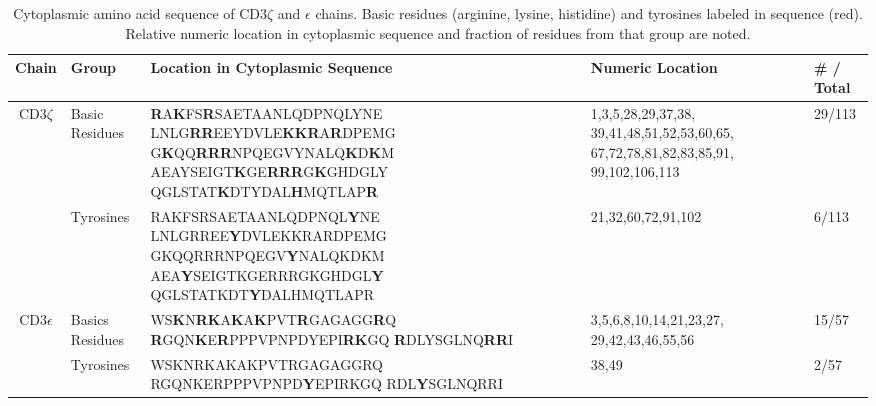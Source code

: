 \documentclass[../../AdvancementSummary.tex]{subfiles}
\begin{document}
\begin{table}[H]
    \caption{Cytoplasmic amino acid sequence of CD3$\zeta$ and $\epsilon$ chains. Basic residues (arginine, lysine, histidine) and tyrosines labeled in sequence (red). Relative numeric location in cytoplasmic sequence and fraction of residues from that group are noted. \label{table: BasicsYLocation}}
    \begin{center}
    \begin{tabular}{|c|p{2cm}|p{6cm}|p{3.5cm}|p{1.6cm}|}
    	\hline
	Chain 		& 		Group			&		Location in Cytoplasmic Sequence	&	Numeric Location		&		\# / Total	\\
	\hline
	
	
    	\multicolumn{1}{|c|}{\multirow{2}[0]{*}{CD3$\zeta$}} 	&  	Basic Residues				& 	
	
	\textbf{\color{red}R}A\textbf{\color{red}K}FS\textbf{\color{red}R}SAETAANLQDPNQLYNE
	LNLG\textbf{\color{red}RR}EEYDVLE\textbf{\color{red}KKR}A\textbf{\color{red}R}DPEMG
	G\textbf{\color{red}K}QQ\textbf{\color{red}RRR}NPQEGVYNALQ\textbf{\color{red}K}D\textbf{\color{red}K}M
	AEAYSEIGT\textbf{\color{red}K}GE\textbf{\color{red}RRR}G\textbf{\color{red}K}GHDGLY
	QGLSTAT\textbf{\color{red}K}DTYDAL\textbf{\color{red}H}MQTLAP\textbf{\color{red}R}		& 	
	
	1,3,5,28,29,37,38,
	39,41,48,51,52,53,60,65,
	67,72,78,81,82,83,85,91,
	99,102,106,113 		& 	
	
	29/113	\\
	\cline{2-5}
	
	
	
		&	 Tyrosines									&	
	
	RAKFSRSAETAANLQDPNQL\textbf{\color{red}Y}NE
	LNLGRREE\textbf{\color{red}Y}DVLEKKRARDPEMG
	GKQQRRRNPQEGV\textbf{\color{red}Y}NALQKDKM
	AEA\textbf{\color{red}Y}SEIGTKGERRRGKGHDGL\textbf{\color{red}Y}
	QGLSTATKDT\textbf{\color{red}Y}DALHMQTLAPR 				& 	
	
	21,32,60,72,91,102											&	
	
	6/113			\\
	\hline
	
	
	\multicolumn{1}{|c|}{\multirow{2}{*}{CD3$\epsilon$}}	&	 Basics Residues		&
	
	WS\textbf{\color{red}K}N\textbf{\color{red}RK}A\textbf{\color{red}K}A\textbf{\color{red}K}PVT\textbf{\color{red}R}GAGAGG\textbf{\color{red}R}Q
	\textbf{\color{red}R}GQN\textbf{\color{red}K}E\textbf{\color{red}R}PPPVPNPDYEPI\textbf{\color{red}RK}GQ
	\textbf{\color{red}R}DLYSGLNQ\textbf{\color{red}RR}I					& 	
	
	3,5,6,8,10,14,21,23,27,
	29,42,43,46,55,56	&		
	
	15/57	\\
	\cline{2-5}
	
	
		&		 Tyrosines				& 	
	
	WSKNRKAKAKPVTRGAGAGGRQ
	RGQNKERPPPVPNPD\textbf{\color{red}Y}EPIRKGQ
	RDL\textbf{\color{red}Y}SGLNQRRI			&
	
	 38,49		& 		
	 
	 2/57			\\
	\hline
    \end{tabular}
    \end{center}
\end{table}
\end{document}
